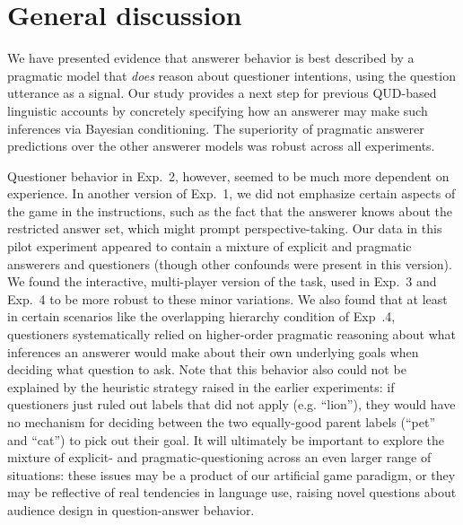 \documentclass[12pt, floatsintext, jou]{apa6}
\begin{document}
\section{General discussion}
\label{sec:gd}

We have presented evidence that answerer behavior is best described by a pragmatic model that \emph{does} reason about questioner intentions, using the question utterance as a signal. Our study provides a next step for previous QUD-based linguistic accounts by concretely specifying how an answerer may make such inferences via Bayesian conditioning. The superiority of pragmatic answerer predictions over the other answerer models was robust across all experiments. 

Questioner behavior in Exp.~2, however, seemed to be much more dependent on experience. In another version of Exp.~1, we did not emphasize certain aspects of the game in the instructions, such as the fact that the answerer knows about the restricted answer set, which might prompt perspective-taking. 
Our data in this pilot experiment appeared to contain a mixture of explicit and pragmatic answerers and questioners (though other confounds were present in this version). We found the interactive, multi-player version of the task, used in Exp.~3 and Exp.~4 to be more robust to these minor variations. We also found that at least in certain scenarios like the overlapping hierarchy condition of Exp~.4, questioners systematically relied on higher-order pragmatic reasoning about what inferences an answerer would make about their own underlying goals when deciding what question to ask. Note that this behavior also could not be explained by the heuristic strategy raised in the earlier experiments: if questioners just ruled out labels that did not apply (e.g. ``lion''), they would have no mechanism for deciding between the two equally-good parent labels (``pet'' and ``cat'') to pick out their goal. It will ultimately be important to explore the mixture of explicit- and pragmatic-questioning across an even larger range of situations: these issues may be a product of our artificial game paradigm, or they may be reflective of real tendencies in language use, raising novel questions about audience design in question-answer behavior.


\end{document}
